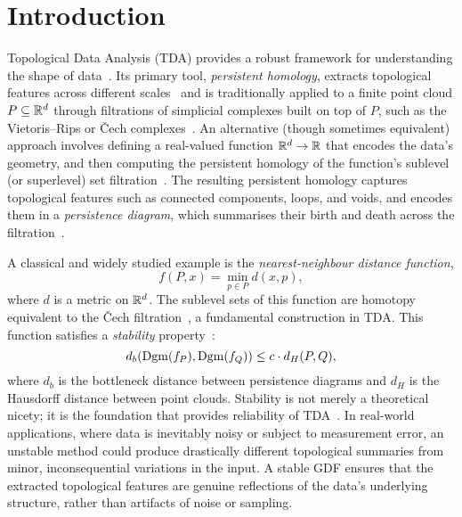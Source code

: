 \newcommand{\package}{\emph}

\chapter{Introduction}
\label{chap:introduction}

Topological Data Analysis (TDA) provides a robust framework for understanding
the shape of data~\cite{carlsson2021topological}. Its primary tool,
\emph{persistent homology}, extracts topological features across different
scales~\cite{boissonnat2018geometric} and is traditionally applied to a finite
point cloud $P \subseteq \mathbb{R}^d$ through filtrations of simplicial complexes built
on top of $P$, such as the Vietoris–Rips or \v{C}ech complexes~\cite{chazal2021introduction}.
An alternative (though sometimes equivalent) approach involves defining a
real-valued function $\mathbb{R}^d \to \mathbb{R}$ that encodes the data's geometry, and
then computing the persistent homology of the function's sublevel (or
superlevel) set filtration~\cite{edelsbrunner2010computational}. The resulting
persistent homology captures topological features such as connected components,
loops, and voids, and encodes them in a \emph{persistence diagram}, which summarises
their birth and death across the filtration~\cite{chazal2021introduction}.

A classical and widely studied example is the \emph{nearest-neighbour distance
function},
\begin{equation}
    f(P, x) = \min_{p \in P} d(x, p),
\end{equation}
where $d$ is a metric on $\mathbb{R}^d$. The sublevel sets of this function are
homotopy equivalent to the \v{C}ech filtration~\cite{schnider2024introduction},
a fundamental construction in TDA.  This function satisfies a \emph{stability}
property~\cite{chazal2013persistencestabilitygeometriccomplexes}:
\begin{equation}
    d_b(\operatorname{Dgm}(f_P), \operatorname{Dgm}(f_Q)) \leq c \cdot d_H(P, Q),
\end{equation}
where $d_b$ is the bottleneck distance between persistence diagrams and $d_H$ is
the Hausdorff distance between point clouds. Stability is not merely a
theoretical nicety; it is the foundation that provides reliability of
TDA~\cite{chazal2021introduction}. In real-world applications, where data is
inevitably noisy or subject to measurement error, an unstable method could
produce drastically different topological summaries from minor, inconsequential
variations in the input. A stable GDF ensures that the extracted topological
features are genuine reflections of the data's underlying structure, rather than
artifacts of noise or sampling.

